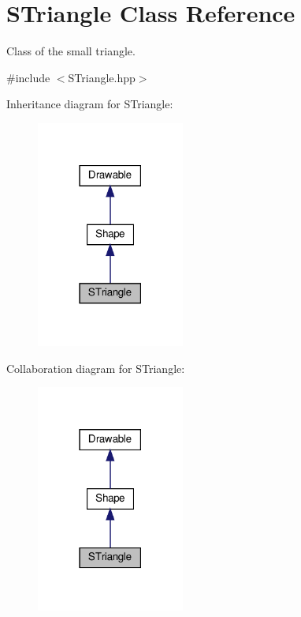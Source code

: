 \hypertarget{classSTriangle}{}\section{S\+Triangle Class Reference}
\label{classSTriangle}


Class of the small triangle.  




{\ttfamily \#include $<$S\+Triangle.\+hpp$>$}



Inheritance diagram for S\+Triangle\+:\nopagebreak
\begin{figure}[H]
\begin{center}
\leavevmode
\includegraphics[width=138pt]{classSTriangle__inherit__graph}
\end{center}
\end{figure}


Collaboration diagram for S\+Triangle\+:\nopagebreak
\begin{figure}[H]
\begin{center}
\leavevmode
\includegraphics[width=138pt]{classSTriangle__coll__graph}
\end{center}
\end{figure}
